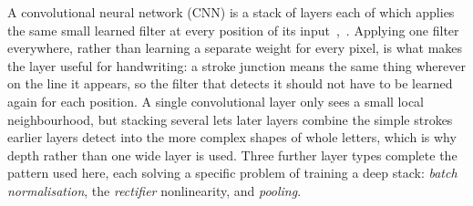 A convolutional neural network (CNN) is a stack of layers each of which applies the same small learned filter at every position of its input~\cite[Sec.~II-A]{lecun1998},~\cite{yahya2021}. Applying one filter everywhere, rather than learning a separate weight for every pixel, is what makes the layer useful for handwriting: a stroke junction means the same thing wherever on the line it appears, so the filter that detects it should not have to be learned again for each position. A single convolutional layer only sees a small local neighbourhood, but stacking several lets later layers combine the simple strokes earlier layers detect into the more complex shapes of whole letters, which is why depth rather than one wide layer is used. Three further layer types complete the pattern used here, each solving a specific problem of training a deep stack: \emph{batch normalisation}, the \emph{rectifier} nonlinearity, and \emph{pooling}.

